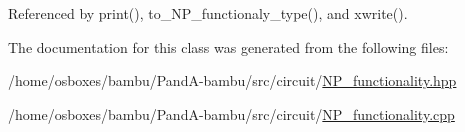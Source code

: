 Referenced by print(), to\+\_\+\+N\+P\+\_\+functionaly\+\_\+type(), and xwrite().



The documentation for this class was generated from the following files\+:\begin{DoxyCompactItemize}
\item 
/home/osboxes/bambu/\+Pand\+A-\/bambu/src/circuit/\hyperlink{NP__functionality_8hpp}{N\+P\+\_\+functionality.\+hpp}\item 
/home/osboxes/bambu/\+Pand\+A-\/bambu/src/circuit/\hyperlink{NP__functionality_8cpp}{N\+P\+\_\+functionality.\+cpp}\end{DoxyCompactItemize}

